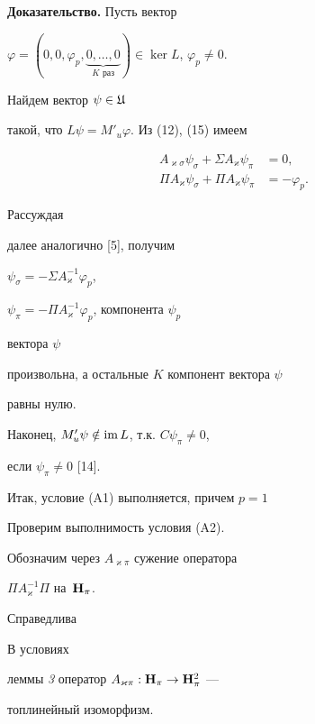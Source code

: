 {\bf Доказательство.} Пусть вектор


$\varphi=(0,0,\varphi_p,\underbrace{0,\dotsc,0}_{K\text{ раз}})


\in\ker L$, $\varphi_p\ne 0$.


Найдем вектор $\psi\in\frak U$


такой, что $L\psi=M'_u\varphi$. Из (12), (15) имеем


\begin{equation}


\begin{split}


A_{\varkappa\sigma}\psi_\sigma+\Sigma A_\varkappa


\psi_\pi&=0,\\


\Pi A_\varkappa\psi_\sigma+\Pi A_\varkappa\psi_\pi


&=-\varphi_p.


\end{split}


\end{equation}


Рассуждая


далее аналогично [5], получим


$\psi_\sigma=-\Sigma A^{-1}_\varkappa\varphi_p$,


$\psi_\pi=-\Pi A^{-1}_\varkappa\varphi_p$, компонента $\psi_p$


вектора $\psi$


произвольна, а остальные $K$ компонент вектора $\psi$


равны нулю.


Наконец, $M'_u\psi\notin\operatorname{im} L$, т.к. $C\psi_\pi\ne 0$,


если $\psi_\pi\ne 0$ [14].


Итак, условие (A1) выполняется, причем $p=1$





Проверим выполнимость условия (A2).


Обозначим через $A_{\varkappa\pi}$ сужение оператора


$\Pi A^{-1}_\varkappa\Pi$ на~$\bold H_\pi$.





Справедлива





\begin{lem} В условиях


леммы {\em 3} оператор $A_{\varkappa\pi}:\bold H_\pi\to\bold H^2_\pi$ ---


топлинейный изоморфизм.


\end{lem}





